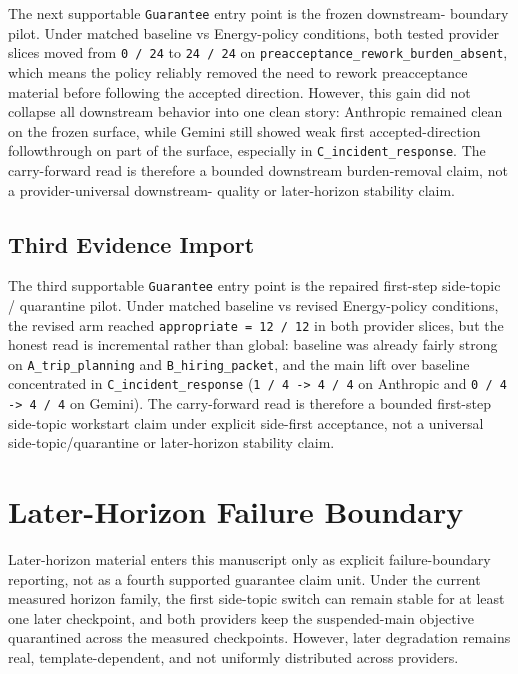 \documentclass[11pt]{article}
\begin{document}
The next supportable \texttt{Guarantee} entry point is the frozen downstream-
boundary pilot. Under matched baseline vs Energy-policy conditions, both tested
provider slices moved from \texttt{0 / 24} to \texttt{24 / 24} on
\texttt{preacceptance\_rework\_burden\_absent}, which means the policy reliably
removed the need to rework preacceptance material before following the accepted
direction. However, this gain did not collapse all downstream behavior into one
clean story: Anthropic remained clean on the frozen surface, while Gemini still
showed weak first accepted-direction followthrough on part of the surface,
especially in \texttt{C\_incident\_response}. The carry-forward read is therefore
a bounded downstream burden-removal claim, not a provider-universal downstream-
quality or later-horizon stability claim.

\subsection{Third Evidence Import}

The third supportable \texttt{Guarantee} entry point is the repaired first-step
side-topic / quarantine pilot. Under matched baseline vs revised Energy-policy
conditions, the revised arm reached \texttt{appropriate = 12 / 12} in both
provider slices, but the honest read is incremental rather than global:
baseline was already fairly strong on \texttt{A\_trip\_planning} and
\texttt{B\_hiring\_packet}, and the main lift over baseline concentrated in
\texttt{C\_incident\_response} (\texttt{1 / 4 -> 4 / 4} on Anthropic and
\texttt{0 / 4 -> 4 / 4} on Gemini). The carry-forward read is therefore a
bounded first-step side-topic workstart claim under explicit side-first
acceptance, not a universal side-topic/quarantine or later-horizon stability
claim.

\section{Later-Horizon Failure Boundary}

Later-horizon material enters this manuscript only as explicit failure-boundary
reporting, not as a fourth supported guarantee claim unit. Under the current
measured horizon family, the first side-topic switch can remain stable for at
least one later checkpoint, and both providers keep the suspended-main objective
quarantined across the measured checkpoints. However, later degradation remains
real, template-dependent, and not uniformly distributed across providers.
\end{document}
